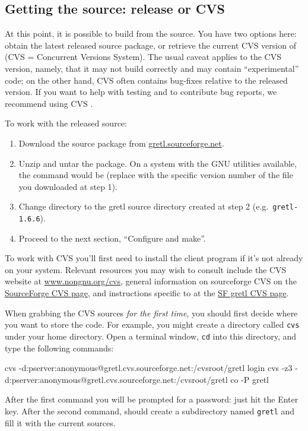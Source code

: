 \subsection{Getting the source: release or CVS}

At this point, it is possible to build from the source.  You have two
options here: obtain the latest released source package, or retrieve
the current CVS version of  (CVS = Concurrent Versions
System).  The usual caveat applies to the CVS version, namely, that it
may not build correctly and may contain ``experimental'' code; on the
other hand, CVS often contains bug-fixes relative to the released
version.  If you want to help with testing and to contribute bug
reports, we recommend using CVS .

To work with the released source:
\begin{enumerate}
\item Download the  source package from
  \href{http://gretl.sourceforge.net/}{gretl.sourceforge.net}.
\item Unzip and untar the package.  On a system with the GNU utilities
  available, the command would be 
  (replace  with the specific version number of the file you
  downloaded at step 1).
\item Change directory to the gretl source directory created at step 2
  (e.g.\ \verb+gretl-1.6.6+).
\item Proceed to the next section, ``Configure and make''.
\end{enumerate}

To work with CVS you'll first need to install the  client
program if it's not already on your system.  Relevant resources
you may wish to consult include the CVS website at
\href{http://www.nongnu.org/cvs/}{www.nongnu.org/cvs},
general information on sourceforge CVS on the 
  \href{http://sourceforge.net/docman/display_doc.php?docid=14035&group_id=1}{SourceForge
    CVS page}, and instructions specific to  at the
\href{http://sourceforge.net/cvs/?group_id=36234}{SF gretl CVS page}.

When grabbing the CVS sources \textit{for the first time}, you should
first decide where you want to store the code.  For example, you might
create a directory called \texttt{cvs} under your home directory.
Open a terminal window, \texttt{cd} into this directory, and type
the following commands:
%
\begin{code}
cvs -d:pserver:anonymous@gretl.cvs.sourceforge.net:/cvsroot/gretl login
cvs -z3 -d:pserver:anonymous@gretl.cvs.sourceforge.net:/cvsroot/gretl co -P gretl
\end{code}
%
After the first command you will be prompted for a password: just hit
the Enter key.  After the second command,  should create a
subdirectory named \texttt{gretl} and fill it with the current
sources.

